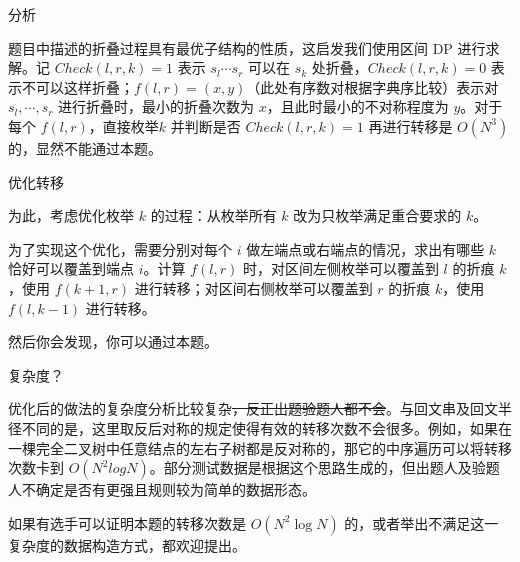 \begin{frame}{分析}
	
	题目中描述的折叠过程具有最优子结构的性质，这启发我们使用区间 DP 进行求解。记 $Check(l, r, k) = 1$ 表示 $s_l \cdots s_r$ 可以在 $s_k$ 处折叠，$Check(l, r, k) = 0$ 表示不可以这样折叠；$f(l,r) =(x,y)$（此处有序数对根据字典序比较）表示对 $s_l, \cdots, s_r$ 进行折叠时，最小的折叠次数为 $x$，且此时最小的不对称程度为 $y$。对于每个 $f(l,r)$，直接枚举$k$ 并判断是否 $Check(l,r,k)=1$ 再进行转移是 $O\left(N^3\right)$ 的，显然不能通过本题。

\end{frame}

\begin{frame}{优化转移}
	
	为此，考虑优化枚举 $k$ 的过程：从枚举所有 $k$ 改为只枚举满足重合要求的 $k$。

	为了实现这个优化，需要分别对每个 $i$ 做左端点或右端点的情况，求出有哪些 $k$ 恰好可以覆盖到端点 $i$。计算 $f(l,r)$ 时，对区间左侧枚举可以覆盖到 $l$ 的折痕 $k$，使用 $f(k+1,r)$ 进行转移；对区间右侧枚举可以覆盖到 $r$ 的折痕 $k$，使用 $f(l,k-1)$ 进行转移。\pause

	然后你会发现，你可以通过本题。

\end{frame}

\begin{frame}{复杂度？}
	
	优化后的做法的复杂度分析比较复杂\sout{，反正出题验题人都不会}。与回文串及回文半径不同的是，这里取反后对称的规定使得有效的转移次数不会很多。例如，如果在一棵完全二叉树中任意结点的左右子树都是反对称的，那它的中序遍历可以将转移次数卡到 $O\left(N^2 log N\right)$。部分测试数据是根据这个思路生成的，但出题人及验题人不确定是否有更强且规则较为简单的数据形态。

	如果有选手可以证明本题的转移次数是 $O(N^2 \log N)$ 的，或者举出不满足这一复杂度的数据构造方式，都欢迎提出。


\end{frame}
